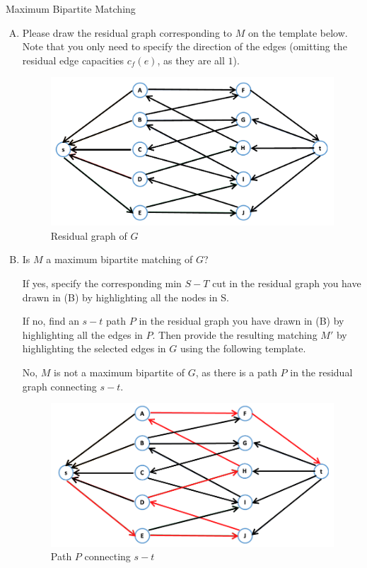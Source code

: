 \documentclass{article}
\numberwithin{table}{section}
\numberwithin{figure}{section}
\begin{document}
\begin{section}{Maximum Bipartite Matching}
\begin{enumerate}[(A)]
    \item Please draw the residual graph corresponding to $M$ on the template
    below. Note that you only need to specify the direction of the edges
    (omitting the residual edge capacities $c_f(e)$, as they are all $1$).

    \begin{tcolorbox}
        \begin{figure}[H]
            \centering
            \includegraphics[width=\linewidth]{figures/p4/3.png}
            \caption{Residual graph of $G$} 
        \end{figure}
    \end{tcolorbox}

    \item Is $M$ a maximum bipartite matching of $G$?
    
    If yes, specify the corresponding min $S - T$ cut in the residual graph you have drawn in (B) by highlighting all the nodes in S. 
    
    If no, find an $s - t$ path $P$ in the residual graph you have drawn in (B) by highlighting all the edges in $P$. Then provide the resulting matching $M'$ by highlighting the selected edges in $G$ using the following template. 

    \begin{tcolorbox}[breakable]
        No, $M$ is not a maximum bipartite of $G$, as there is a path $P$ in the residual graph connecting $s-t$. 
        \begin{figure}[H]
            \centering
            \includegraphics[width=\linewidth]{figures/p4/4.png}
            \caption{Path $P$ connecting $s-t$} 
        \end{figure}


\end{tcolorbox}
\end{enumerate}
\end{section}
\end{document}
